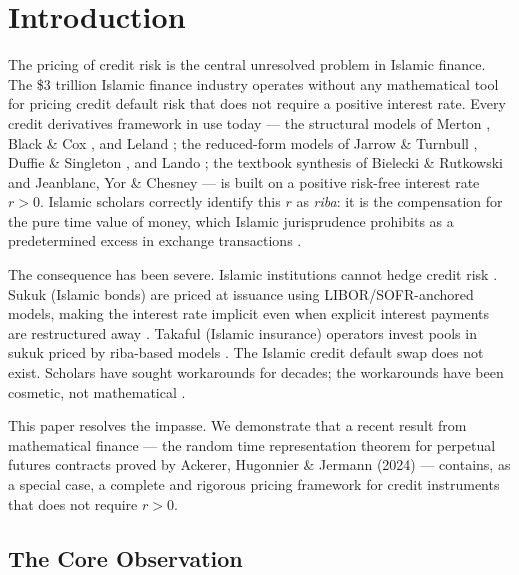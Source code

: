 \documentclass[10pt,twocolumn]{article}
\theoremstyle{plain}
\theoremstyle{definition}
\begin{document}
\section{Introduction}

The pricing of credit risk is the central unresolved problem in Islamic
finance. The \$3 trillion Islamic finance industry \cite{IFSB2024} operates
without any mathematical tool for pricing credit default risk that does not
require a positive interest rate. Every credit derivatives framework in use
today --- the structural models of Merton \cite{Merton1974}, Black \&
Cox \cite{BlackCox1976}, and Leland \cite{Leland1994}; the reduced-form
models of Jarrow \& Turnbull \cite{JarrowTurnbull1995}, Duffie \&
Singleton \cite{DuffieSingleton1999,DuffieSingleton2003}, and Lando
\cite{Lando1998}; the textbook synthesis of Bielecki \& Rutkowski
\cite{BieleckiRutkowski2002} and Jeanblanc, Yor \& Chesney
\cite{JeanblanYorChesney2009} --- is built on a positive risk-free
interest rate $r > 0$. Islamic scholars correctly identify this $r$ as
\textit{riba}: it is the compensation for the pure time value of money,
which Islamic jurisprudence prohibits as a predetermined excess in exchange
transactions \cite{ElGamal2006,Usmani2002}.

The consequence has been severe. Islamic institutions cannot hedge credit
risk \cite{KhanAhmed2001}. Sukuk (Islamic bonds) are priced at issuance
using LIBOR/SOFR-anchored models, making the interest rate implicit even
when explicit interest payments are restructured away
\cite{KhanAbdallah2017,JobstHull2008,Reboredo2021}. Takaful (Islamic
insurance) operators invest pools in sukuk priced by riba-based models
\cite{BillahMasum2023}. The Islamic credit default swap does not exist.
Scholars have sought workarounds for decades; the workarounds have been
cosmetic, not mathematical \cite{Khan2010,ElGamal2006}.

This paper resolves the impasse. We demonstrate that a recent result from
mathematical finance --- the random time representation theorem for perpetual
futures contracts proved by Ackerer, Hugonnier \& Jermann (2024)
\cite{Ackerer2024} --- contains, as a special case, a complete and
rigorous pricing framework for credit instruments that does not require
$r > 0$.

\subsection*{The Core Observation}
\end{document}
